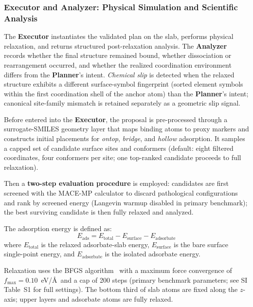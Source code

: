 \subsubsection{Executor and Analyzer: Physical Simulation and Scientific Analysis}

The \textbf{Executor} instantiates the validated plan on the slab, performs physical relaxation, and returns structured post-relaxation analysis.
The \textbf{Analyzer} records whether the final structure remained bound, whether dissociation or rearrangement occurred, and whether the realized coordination environment differs from the \textbf{Planner}'s intent.
\textit{Chemical slip} is detected when the relaxed structure exhibits a different surface-symbol fingerprint (sorted element symbols within the first coordination shell of the anchor atom) than the \textbf{Planner}'s intent; canonical site-family mismatch is retained separately as a geometric slip signal.

Before entered into the \textbf{Executor}, the proposal is pre-processed through a surrogate-SMILES geometry layer that maps binding atoms to proxy markers and constructs initial placements for \textit{ontop}, \textit{bridge}, and \textit{hollow} adsorption.
It samples a capped set of candidate surface sites and conformers (default: eight filtered coordinates, four conformers per site; one top-ranked candidate proceeds to full relaxation).

Then a \textbf{two-step evaluation procedure} is employed: candidates are first screened with the MACE-MP calculator to discard pathological configurations and rank by screened energy (Langevin warmup disabled in primary benchmark); the best surviving candidate is then fully relaxed and analyzed.

The adsorption energy is defined as:
\begin{equation}
    E_{\text{ads}} = E_{\text{total}} - E_{\text{surface}} - E_{\text{adsorbate}}
\end{equation}
where $E_{\text{total}}$ is the relaxed adsorbate-slab energy, $E_{\text{surface}}$ is the bare surface single-point energy, and $E_{\text{adsorbate}}$ is the isolated adsorbate energy.

Relaxation uses the BFGS algorithm~\cite{nocedal2006numerical} with a maximum force convergence of $f_{\text{max}} = 0.10$~eV/\AA\ and a cap of 200 steps (primary benchmark parameters; see SI Table~S1 for full settings). The bottom third of slab atoms are fixed along the $z$-axis; upper layers and adsorbate atoms are fully relaxed.

